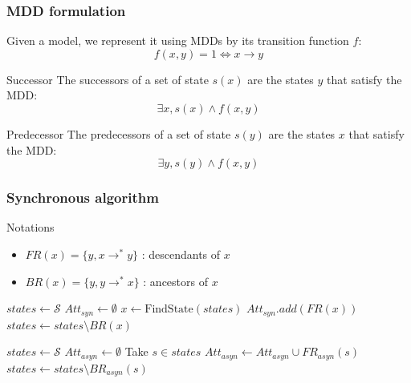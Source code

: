 \documentclass{beamer}
\begin{document}
\begin{frame}
  \frametitle{MDD formulation}
  \begin{block}{}
    Given a model, we represent it using MDDs by its transition function $f$:
    $$ f(x,y) =1 \Leftrightarrow x \rightarrow y$$
  \end{block}
  
  \begin{block}{Successor}
    The successors of a set of state $s(x)$ are the states $y$ that satisfy the MDD:
    $$ \exists x, s(x) \wedge f(x,y)$$
  \end{block}
  
  \begin{block}{Predecessor}
    The predecessors of a set of state $s(y)$ are the states $x$ that satisfy the MDD:
    $$ \exists y, s(y) \wedge f(x,y)$$
  \end{block}
\end{frame}

\begin{frame}
  \frametitle{Synchronous algorithm}
  
  \begin{block}{Notations}
    \begin{itemize}
    \item $FR(x) = \{ y,  x \rightarrow^* y \}$ : descendants of $x$
    \item $BR(x) = \{ y, y \rightarrow^* x \} $ : ancestors of $x$
    \end{itemize}
  \end{block}
  
  \bigskip
  \begin{algorithmic}
    \State $states \gets \mathcal S$
    \State $Att_{syn} \gets \emptyset$
      \State $x \gets \text{FindState}(states)$
      \State $Att_{syn}.add(FR(x))$
      \State $states \gets states \setminus BR(x)$
    \EndWhile
  \end{algorithmic}
  
\end{frame}

\begin{frame}


\begin{algorithmic}
\State $states \gets \mathcal{S}$
\State $Att_{asyn} \gets \emptyset$
	\State Take $s \in states$ 
		\State $Att_{asyn} \gets Att_{asyn} \cup FR_{asyn}(s)$ 
	\EndIf 
	\State $states \gets states \setminus BR_{asyn}(s)$
\EndWhile
\end{algorithmic}

\end{frame}
\end{document}
